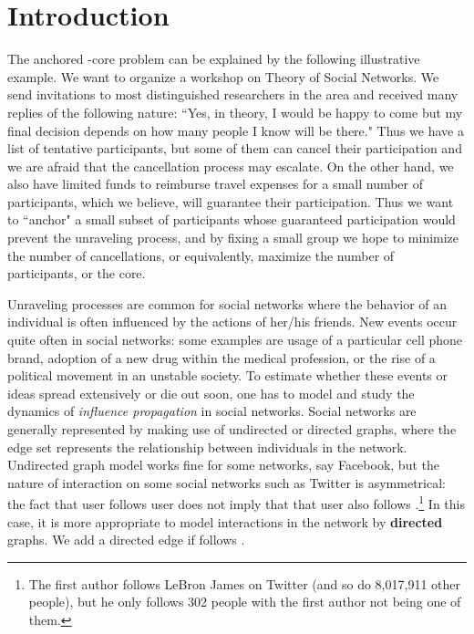 \documentclass[11pt,a4paper]{article}
\begin{document}
\section{Introduction}\label{sec:intro}
The anchored -core problem can be explained by the following illustrative example. We want
to organize a workshop on Theory of Social Networks. We send invitations to most  distinguished researchers in the area and
received many  replies of the following nature: ``Yes, in theory, I would be happy to come but my final decision  depends on
how many   people I know will be there."  Thus  we have a list of  tentative participants, but some of them can cancel their
participation and we are afraid that the cancellation process
may escalate. On the other hand, we also have  limited funds to reimburse travel expenses for
a small number of participants, which we believe, will guarantee their participation. Thus we want to ``anchor" a small subset
of  participants whose guaranteed participation would prevent the unraveling process, and by
fixing a small group   we hope to minimize the number of cancellations, or equivalently,
maximize the number of participants, or the core.

Unraveling processes are common for social networks where the behavior of an individual is often influenced by the actions of
her/his friends. New events occur quite often in social networks: some examples are usage of a particular cell phone brand,
adoption of a new drug within the medical profession, or the rise of a political movement in an unstable society. To estimate
whether these events or ideas spread extensively or die out soon, one has  to model and study the dynamics of \emph{influence
propagation} in social networks. Social networks are generally represented by making use of  undirected or directed graphs,
where the edge set represents  the relationship between individuals in the network. Undirected graph  model works fine for
some networks, say Facebook, but the nature of interaction on some social networks such as Twitter is asymmetrical:  the fact
that  user  follows  user  does not imply that that user  also follows .\footnote{The first author follows LeBron
James on Twitter (and so do 8,017,911 other people), but he only follows 302 people with the first author not being one of
them.}  In this case, it is more appropriate to model interactions in  the network by \textbf{directed} graphs. We add a
directed edge  if  follows .
\end{document}
